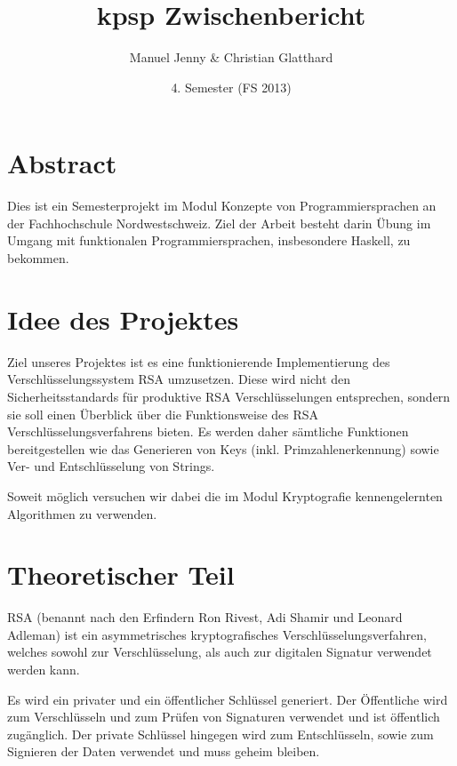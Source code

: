 \documentclass[a4paper, 11pt]{article} %
\title{kpsp Zwischenbericht}
\author{Manuel Jenny \& Christian Glatthard}
\date{4. Semester (FS 2013)}
\begin{document}
\maketitle
\thispagestyle{fancy}

\newpage

\tableofcontents	  	


\newpage
\setcounter{page}{1}


\section{Abstract}
Dies ist ein Semesterprojekt im Modul Konzepte von Programmiersprachen an der Fachhochschule Nordwestschweiz. Ziel der Arbeit besteht darin Übung im Umgang mit funktionalen Programmiersprachen, insbesondere Haskell, zu bekommen.

\section{Idee des Projektes}
Ziel unseres Projektes ist es eine funktionierende Implementierung des Verschlüsselungssystem RSA umzusetzen. Diese wird nicht den Sicherheitsstandards für produktive RSA Verschlüsselungen entsprechen, sondern sie soll einen Überblick über die Funktionsweise des RSA Verschlüsselungsverfahrens bieten. Es werden daher sämtliche Funktionen bereitgestellen wie das Generieren von Keys (inkl. Primzahlenerkennung) sowie Ver- und Entschlüsselung von Strings.

Soweit möglich versuchen wir dabei die im Modul Kryptografie kennengelernten Algorithmen zu verwenden.

\section{Theoretischer Teil}
RSA (benannt nach den Erfindern Ron Rivest, Adi Shamir und Leonard Adleman) ist ein asymmetrisches kryptografisches Verschlüsselungsverfahren, welches sowohl zur Verschlüsselung, als auch zur digitalen Signatur verwendet werden kann.

Es wird ein privater und ein öffentlicher Schlüssel generiert. Der Öffentliche wird zum Verschlüsseln und zum Prüfen von Signaturen verwendet und ist öffentlich zugänglich. Der private Schlüssel hingegen wird zum Entschlüsseln, sowie zum Signieren der Daten verwendet und muss geheim bleiben.
\end{document}
